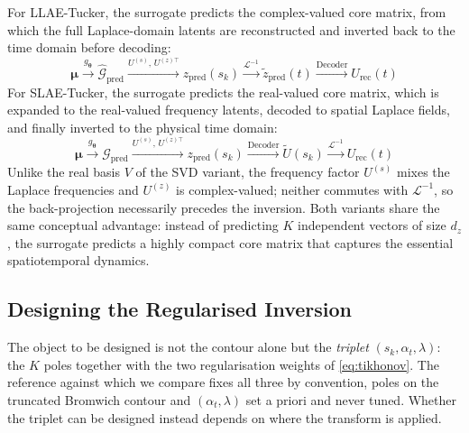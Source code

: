 ﻿\documentclass[a4paper,12pt]{article}
\theoremstyle{definition}
\theoremstyle{remark}
\newcommand{\vmu}{\bm{\mu}}
\begin{document}
For LLAE-Tucker, the surrogate predicts the complex-valued core matrix, from which the full Laplace-domain latents are reconstructed and inverted back to the time domain before decoding:
\begin{equation}
    \vmu \xrightarrow{g_{\bm{\theta}}} \hat{\mathcal{G}}_{\mathrm{pred}} \xrightarrow{U^{(s)},\, U^{(z)\top}} \hat{z}_{\mathrm{pred}}(s_k) \xrightarrow{\mathcal{L}^{-1}} \tilde{z}_{\mathrm{pred}}(t) \xrightarrow{\mathrm{Decoder}} U_{\mathrm{rec}}(t)
\end{equation}
For SLAE-Tucker, the surrogate predicts the real-valued core matrix, which is expanded to the real-valued frequency latents, decoded to spatial Laplace fields, and finally inverted to the physical time domain:
\begin{equation}
    \vmu \xrightarrow{g_{\bm{\theta}}} \mathcal{G}_{\mathrm{pred}} \xrightarrow{U^{(s)},\, U^{(z)\top}} z_{\mathrm{pred}}(s_k) \xrightarrow{\mathrm{Decoder}} \tilde{U}(s_k) \xrightarrow{\mathcal{L}^{-1}} U_{\mathrm{rec}}(t)
\end{equation}
Unlike the real basis $V$ of the SVD variant, the frequency factor $U^{(s)}$ mixes the Laplace frequencies and $U^{(z)}$ is complex-valued; neither commutes with $\mathcal{L}^{-1}$, so the back-projection necessarily precedes the inversion. Both variants share the same conceptual advantage: instead of predicting $K$ independent vectors of size $d_z$, the surrogate predicts a highly compact core matrix that captures the essential spatiotemporal dynamics.

\subsection{Designing the Regularised Inversion}
\label{sec:contour_optim}

The object to be designed is not the contour alone but the \emph{triplet} $(s_k, \alpha_t, \lambda)$: the $K$ poles together with the two regularisation weights of \eqref{eq:tikhonov}. The reference against which we compare fixes all three by convention, poles on the truncated Bromwich contour and $(\alpha_t, \lambda)$ set a priori and never tuned. Whether the triplet can be designed instead depends on where the transform is applied.
\end{document}
